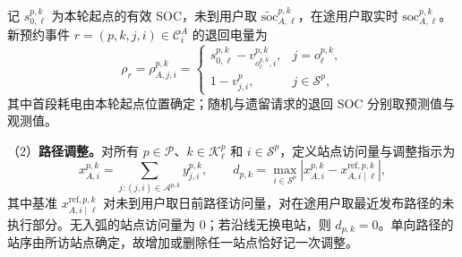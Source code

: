 \documentclass[12pt,a4paper,UTF8]{ctexart}
\begin{document}
记 $s_{0,\ell}^{p,k}$ 为本轮起点的有效 SOC，未到用户取 $\widetilde{\mathrm{soc}}_{A,\ell}^{p,k}$，在途用户取实时 $\mathrm{soc}_{A,\ell}^{p,k}$。新预约事件 $r=(p,k,j,i)\in\mathcal C_i^A$ 的退回电量为
\begin{equation}
\rho_r=\rho_{A,j,i}^{p,k}
=\begin{cases}
s_{0,\ell}^{p,k}-v_{o_\ell^{p,k},i}^{p,k},&j=o_\ell^{p,k},\\
1-v_{j,i}^{p},&j\in\mathcal S^p,
\end{cases}
\label{eq:return_soc}
\end{equation}
其中首段耗电由本轮起点位置确定；随机与遗留请求的退回 SOC 分别取预测值与观测值。

（2）\textbf{路径调整。}对所有 $p\in\mathcal P$、$k\in\mathcal K_\ell^p$ 和 $i\in\mathcal S^p$，定义站点访问量与调整指示为
\begin{equation}
x_{A,i}^{p,k}=\sum_{j:(j,i)\in\mathcal A^{p,k}}y_{j,i}^{p,k},
\qquad
d_{p,k}=\max_{i\in\mathcal S^p}
\left|x_{A,i}^{p,k}-x_{A,i\mid\ell}^{\mathrm{ref},p,k}\right|,
\label{eq:path_adjustment_indicator}
\end{equation}
其中基准 $x_{A,i\mid\ell}^{\mathrm{ref},p,k}$ 对未到用户取日前路径访问量，对在途用户取最近发布路径的未执行部分。无入弧的站点访问量为 $0$；若沿线无换电站，则 $d_{p,k}=0$。单向路径的站序由所访站点确定，故增加或删除任一站点恰好记一次调整。
\end{document}
